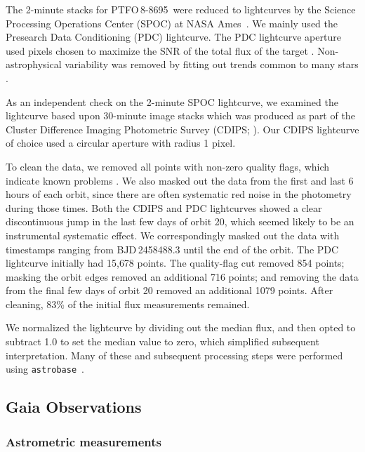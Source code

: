 \documentclass[12pt,twocolumn,tighten]{aastex62}
\newcommand{\ptfo}{PTFO$\,$8-8695}
\begin{document}
The 2-minute stacks for \ptfo\ were reduced to lightcurves by the
Science Processing Operations Center (SPOC) at NASA
Ames~\citep{jenkins_tess_2016}.  We mainly used the
Presearch Data Conditioning (PDC) lightcurve.  The PDC lightcurve
aperture used pixels chosen to maximize the SNR of the total flux of
the target \citep{smith_kepler_apertures_2017}.  Non-astrophysical
variability was removed by fitting out trends common to many stars
\citep{smith_kepler_PDC_2017}.

As an independent check on the 2-minute SPOC lightcurve, we
examined the lightcurve based upon 30-minute image stacks which was
produced as part of the Cluster
Difference Imaging Photometric Survey (CDIPS;
\citealt{bouma_cluster_2019}).  Our CDIPS lightcurve of choice used a
circular aperture with radius 1 pixel.

To clean the data, we removed all points with non-zero quality flags,
which indicate known problems
\citep[{\it e.g.},][]{tess_data_product_description_2018}.  We also
masked out the data from the first and last 6 hours of each orbit, since there are
often systematic red noise in the photometry during those times.  Both the CDIPS and PDC
lightcurves showed a clear discontinuous jump in the last few days
of orbit 20, which seemed likely to be an instrumental systematic effect.  We
correspondingly masked out the data with timestamps ranging from BJD\,2458488.3 until
the end of the orbit.  The PDC lightcurve initially had 15{,}678 points.  The
quality-flag cut removed 854 points; masking the orbit edges removed an
additional 716 points; and removing the data from the final few days of orbit 20 removed an
additional 1079 points.  After cleaning, 83\% of the initial flux
measurements remained.

We normalized the lightcurve by dividing out the median flux, and then opted
to subtract 1.0 to set the median value to zero, which simplified
subsequent interpretation.  Many
of these and subsequent processing steps were performed using
\texttt{astrobase}~\citep{bhatti_astrobase_2018}. 


\subsection{Gaia Observations}

\subsubsection{Astrometric measurements}
\end{document}
